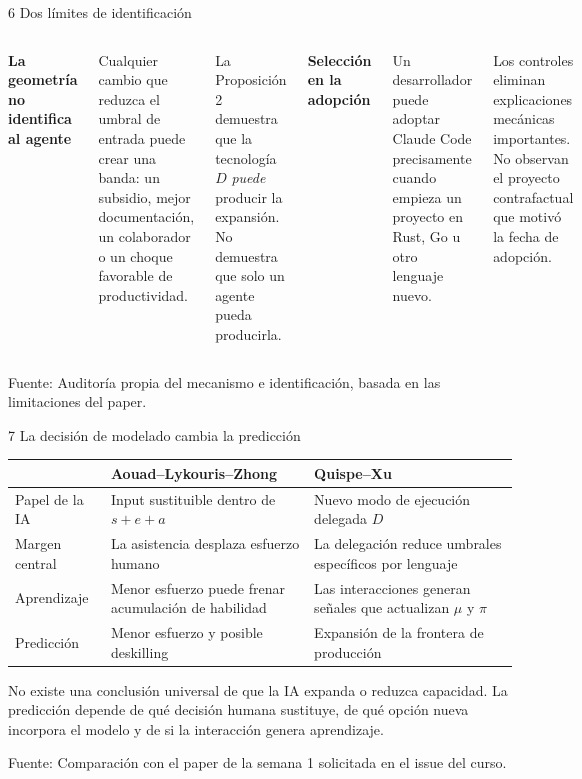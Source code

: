 \documentclass[aspectratio=169,11pt]{beamer}
\newcommand{\sourcefoot}[1]{\vfill{\scriptsize\color{black!60}Fuente: #1}}
\begin{document}
\begin{frame}{6 \textperiodcentered{} Dos límites de identificación}
  \begin{columns}[T,onlytextwidth]
    \textbf{La geometría no identifica al agente}

    Cualquier cambio que reduzca el umbral de entrada puede crear una banda:
    un subsidio, mejor documentación, un colaborador o un choque favorable de
    productividad.

    \medskip
    La Proposición 2 demuestra que la tecnología $D$ \emph{puede} producir la
    expansión. No demuestra que solo un agente pueda producirla.

    \textbf{Selección en la adopción}

    Un desarrollador puede adoptar Claude Code precisamente cuando empieza un
    proyecto en Rust, Go u otro lenguaje nuevo.

    \medskip
    Los controles eliminan explicaciones mecánicas importantes. No observan el
    proyecto contrafactual que motivó la fecha de adopción.
  \end{columns}

  \sourcefoot{Auditoría propia del mecanismo e identificación, basada en las limitaciones del paper.}
\end{frame}

\begin{frame}{7 \textperiodcentered{} La decisión de modelado cambia la predicción}
  \begin{tabularx}{\textwidth}{@{}p{}XX@{}}
    \toprule
      & Aouad--Lykouris--Zhong & Quispe--Xu \\
    \midrule
    Papel de la IA
      & Input sustituible dentro de $s+e+a$
      & Nuevo modo de ejecución delegada $D$ \\
    \addlinespace
    Margen central
      & La asistencia desplaza esfuerzo humano
      & La delegación reduce umbrales específicos por lenguaje \\
    \addlinespace
    Aprendizaje
      & Menor esfuerzo puede frenar acumulación de habilidad
      & Las interacciones generan señales que actualizan $\mu$ y $\pi$ \\
    \addlinespace
    Predicción
      & Menor esfuerzo y posible deskilling
      & Expansión de la frontera de producción \\
    \bottomrule
  \end{tabularx}

  \medskip
  No existe una conclusión universal de que la IA expanda o reduzca capacidad.
  La predicción depende de qué decisión humana sustituye, de qué opción nueva
  incorpora el modelo y de si la interacción genera aprendizaje.

  \sourcefoot{Comparación con el paper de la semana 1 solicitada en el issue del curso.}
\end{frame}
\end{document}
